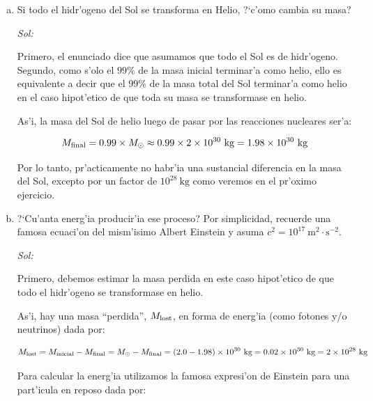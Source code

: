 \documentclass{article}
\begin{document}
\begin{enumerate} [a)]
Es decir, la masa final es s'olo un $99 \%$ de la masa inicial. ?`Qu'e pas'o con el otro $1 \%$? Es la masa que se perdi'o en forma de energ'ia, ya sea en forma de fotones y/o neutrinos, entre otros.
\item Si todo el hidr'ogeno del Sol se transforma en Helio, ?`c'omo cambia su masa?

\vspace{2mm}
\emph{Sol:}
\vspace{2mm}

Primero, el enunciado dice que asumamos que todo el Sol es de hidr'ogeno. Segundo, como s'olo el $99\%$ de la masa inicial terminar'a como helio, ello es equivalente a decir que el $99\%$ de la masa total del Sol terminar'a como helio en el caso hipot'etico de que toda su masa se transformase en helio.

As'i, la masa del Sol de helio luego de pasar por las reacciones nucleares ser'a:

\begin{equation}
M_{\rm final} = 0.99 \times M_\odot \approx 0.99 \times 2 \times 10^{30} \ \text{kg} = 1.98 \times 10^{30} \ \text{kg} 
\end{equation}

Por lo tanto, pr'acticamente no habr'ia una sustancial diferencia en la masa del Sol, excepto por un factor de $10^{28} \ \text{kg}$ como veremos en el pr'oximo ejercicio.

\item ?`Cu'anta energ'ia producir'ia ese proceso? Por simplicidad, recuerde una famosa ecuaci'on del mism'isimo Albert Einstein y asuma $c^2 = 10^{17} \ \text{m}^2\cdot \text{s}^{-2}$.

\vspace{2mm}
\emph{Sol:}
\vspace{2mm}

Primero, debemos estimar la masa perdida en este caso hipot'etico de que todo el hidr'ogeno se  transformase en helio.


As'i, hay una masa ``perdida'', $M_{\rm lost}$, en forma de energ'ia (como fotones y/o neutrinos) dada por:

\begin{equation}
M_{\rm lost} = M_{\rm inicial} - M_{\rm final} = M_\odot - M_{\rm final} = (2.0-1.98) \times 10^{30} \ \text{kg} = 0.02 \times 10^{30} \ \text{kg} = 2 \times 10^{28} \ \text{kg}
\end{equation}

Para calcular la energ'ia utilizamos la famosa expresi'on de Einstein para una part'icula en reposo dada por:


\end{enumerate}
\end{document}
